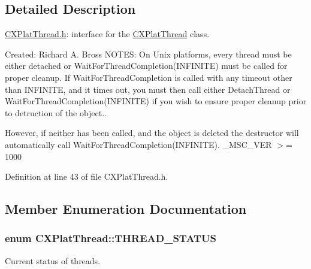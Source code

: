 \subsection{\-Detailed \-Description}
\hyperlink{_c_x_plat_thread_8h}{\-C\-X\-Plat\-Thread.\-h}\-: interface for the \hyperlink{class_c_x_plat_thread}{\-C\-X\-Plat\-Thread} class. 

\-Created\-: \-Richard \-A. \-Bross \-N\-O\-T\-E\-S\-: \-On \-Unix platforms, every thread must be either detached or \-Wait\-For\-Thread\-Completion(\-I\-N\-F\-I\-N\-I\-T\-E) must be called for proper cleanup. \-If \-Wait\-For\-Thread\-Completion is called with any timeout other than \-I\-N\-F\-I\-N\-I\-T\-E, and it times out, you must then call either \-Detach\-Thread or \-Wait\-For\-Thread\-Completion(\-I\-N\-F\-I\-N\-I\-T\-E) if you wish to ensure proper cleanup prior to detruction of the object..

\-However, if neither has been called, and the object is deleted the destructor will automatically call \-Wait\-For\-Thread\-Completion(\-I\-N\-F\-I\-N\-I\-T\-E). \-\_\-\-M\-S\-C\-\_\-\-V\-E\-R $>$= 1000 

\-Definition at line 43 of file \-C\-X\-Plat\-Thread.\-h.



\subsection{\-Member \-Enumeration \-Documentation}
\hypertarget{class_c_x_plat_thread_a15b8bc4370560890e1a1ae0dce671c01}{
\subsubsection[{\-T\-H\-R\-E\-A\-D\-\_\-\-S\-T\-A\-T\-U\-S}]{\setlength{\rightskip}{0pt plus 5cm}enum {\bf \-C\-X\-Plat\-Thread\-::\-T\-H\-R\-E\-A\-D\-\_\-\-S\-T\-A\-T\-U\-S}}}\label{class_c_x_plat_thread_a15b8bc4370560890e1a1ae0dce671c01}


\-Current status of threads. 

